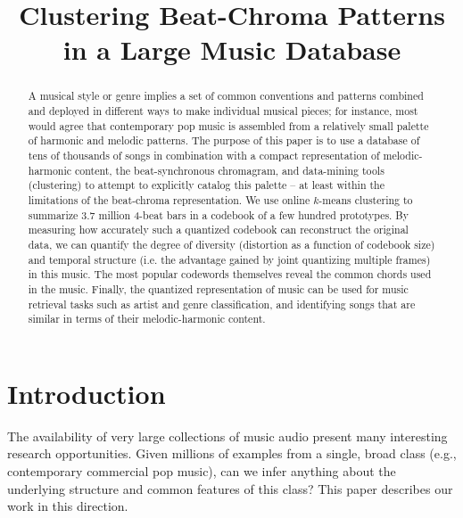 \documentclass{article}
\title{Clustering Beat-Chroma Patterns in a Large Music Database}
\begin{document}
%
\maketitle
%
\begin{abstract}
A musical style or genre implies a set of common conventions
and patterns combined and deployed in different ways to make
individual musical pieces; for instance, most would agree that
contemporary pop music is assembled from a relatively small
palette of harmonic and melodic patterns.  The purpose of this
paper is to use a database of tens of thousands of songs
in combination with a compact representation of melodic-harmonic
content, the beat-synchronous chromagram, and data-mining
tools (clustering) to attempt to explicitly catalog this palette --
at least within the limitations of the beat-chroma representation.
We use online $k$-means clustering to summarize 3.7 million
4-beat bars in a codebook of a few hundred prototypes.
By measuring how accurately such a quantized codebook
can reconstruct the original data, we can quantify the degree
of diversity (distortion as a function of codebook size) and
temporal structure (i.e. the advantage gained
by joint quantizing multiple frames) in this music.  The most
popular codewords themselves reveal the common chords
used in the music.  Finally, the quantized representation of
music can be used for music retrieval tasks such as artist
and genre classification, and identifying songs that are
similar in terms of their melodic-harmonic content.
\end{abstract}
%
\section{Introduction}\label{sec:introduction}
The availability of very large collections of music audio present
many interesting research opportunities.  Given millions of examples
from a single, broad class (e.g., contemporary commercial pop music),
can we infer anything about the underlying structure and common
features of this class?  This paper describes our work in this direction.
\end{document}
